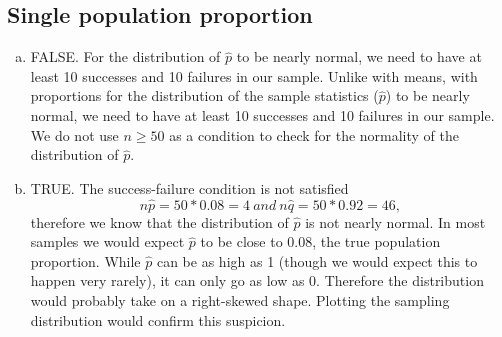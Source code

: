 %



\subsection{Single population proportion}


{
{
\begin{enumerate}[(a)]
\item FALSE. For the distribution of $\hat{p}$ to be nearly normal, we need to have at least 10 successes and 10 failures in our sample. Unlike with means, with proportions for the distribution of the sample statistics ($\hat{p}$) to be nearly normal, we need to have at least 10 successes and 10 failures in our sample. We do not use $n \ge 50$ as a condition to check for the normality of the distribution of $\hat{p}$.
\item TRUE. The success-failure condition is not satisfied
\[ n\hat{p} = 50 * 0.08 = 4~and~ n\hat{q} = 50 * 0.92 = 46, \]
therefore we know that the distribution of $\hat{p}$ is not nearly normal. In most samples we would expect $\hat{p}$ to be close to 0.08, the true population proportion. While $\hat{p}$ can be as high as 1 (though we would expect this to happen very rarely), it can only go as low as 0. Therefore the distribution would probably take on a right-skewed shape. Plotting the sampling distribution would confirm this suspicion.

\end{enumerate}}}
